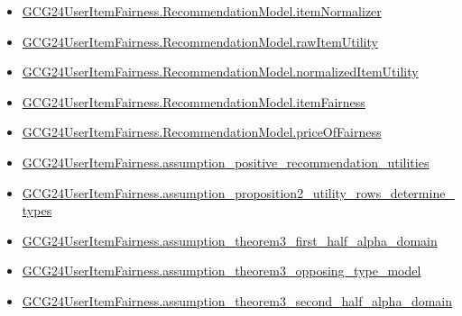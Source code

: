 \documentclass[10pt]{article}
\begin{document}
\begin{itemize}[leftmargin=1.2em]
\begin{itemize}[leftmargin=1.2em]
\item \hyperlink{paper-prerequisite-0d23aa1a63154ec0}{GCG24\allowbreak{}User\allowbreak{}Item\allowbreak{}Fairness.\allowbreak{}Recommendation\allowbreak{}Model.\allowbreak{}item\allowbreak{}Normalizer}
\item \hyperlink{paper-prerequisite-9f46fc286907aebf}{GCG24\allowbreak{}User\allowbreak{}Item\allowbreak{}Fairness.\allowbreak{}Recommendation\allowbreak{}Model.\allowbreak{}raw\allowbreak{}Item\allowbreak{}Utility}
\item \hyperlink{paper-prerequisite-bce270fcac2ae7f9}{GCG24\allowbreak{}User\allowbreak{}Item\allowbreak{}Fairness.\allowbreak{}Recommendation\allowbreak{}Model.\allowbreak{}normalized\allowbreak{}Item\allowbreak{}Utility}
\item \hyperlink{paper-prerequisite-f7870d3a808a042a}{GCG24\allowbreak{}User\allowbreak{}Item\allowbreak{}Fairness.\allowbreak{}Recommendation\allowbreak{}Model.\allowbreak{}item\allowbreak{}Fairness}
\item \hyperlink{paper-prerequisite-b92c02c4ebadd933}{GCG24\allowbreak{}User\allowbreak{}Item\allowbreak{}Fairness.\allowbreak{}Recommendation\allowbreak{}Model.\allowbreak{}price\allowbreak{}Of\allowbreak{}Fairness}
\item \hyperlink{paper-prerequisite-c3fb62153de6abb9}{GCG24\allowbreak{}User\allowbreak{}Item\allowbreak{}Fairness.\allowbreak{}assumption\_\allowbreak{}positive\_\allowbreak{}recommendation\_\allowbreak{}utilities}
\item \hyperlink{paper-prerequisite-47771cedb9e12e6f}{GCG24\allowbreak{}User\allowbreak{}Item\allowbreak{}Fairness.\allowbreak{}assumption\_\allowbreak{}proposition2\_\allowbreak{}utility\_\allowbreak{}rows\_\allowbreak{}determine\_\allowbreak{}types}
\item \hyperlink{paper-prerequisite-5d0fb3233ce612d8}{GCG24\allowbreak{}User\allowbreak{}Item\allowbreak{}Fairness.\allowbreak{}assumption\_\allowbreak{}theorem3\_\allowbreak{}first\_\allowbreak{}half\_\allowbreak{}alpha\_\allowbreak{}domain}
\item \hyperlink{paper-prerequisite-2aba0582e6373e4d}{GCG24\allowbreak{}User\allowbreak{}Item\allowbreak{}Fairness.\allowbreak{}assumption\_\allowbreak{}theorem3\_\allowbreak{}opposing\_\allowbreak{}type\_\allowbreak{}model}
\item \hyperlink{paper-prerequisite-57ab87149fe0d068}{GCG24\allowbreak{}User\allowbreak{}Item\allowbreak{}Fairness.\allowbreak{}assumption\_\allowbreak{}theorem3\_\allowbreak{}second\_\allowbreak{}half\_\allowbreak{}alpha\_\allowbreak{}domain}

\end{itemize}
\end{itemize}
\end{document}
